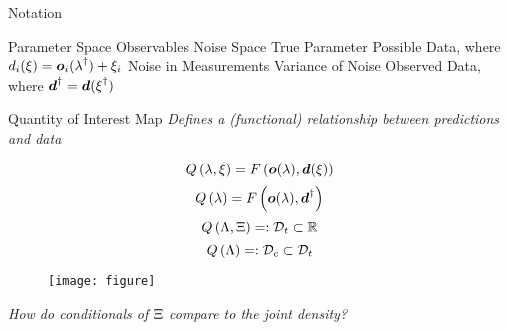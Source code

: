 \begin{block}{Notation}
\large
    \begin{itemize}
         Parameter Space
         Observables
         Noise Space
        \itembox{$\param^\dagger\in\pspace$} True Parameter
         Possible Data, where $d_i(\operatorname*{\xi}) = \boldsymbol{o}_i(\operatorname*{\lambda}^\dagger) + \xi_i$
        \itembox{$\noise^\dagger\in\nspace$} Noise in Measurements
        \itembox{$ \sigma $} Variance of Noise
         Observed Data, where $\boldsymbol{d}^\dagger = \boldsymbol{d}(\operatorname*{\xi}^\dagger)$
    \end{itemize}

\end{block}

\begin{block}{Quantity of Interest Map}
\centering
\large
    \emph{Defines a (functional) relationship between predictions and data}

        $$Q \left (\operatorname*{\lambda}, \operatorname*{\xi} \right ) = F \left ( \boldsymbol{o}(\operatorname*{\lambda}), \boldsymbol{d}(\operatorname*{\xi}) \right ) $$
        $$Q \left (\operatorname*{\lambda} \right ) = F \left ( \boldsymbol{o}(\operatorname*{\lambda}), \boldsymbol{d}^\dagger \right )$$
        $$Q \left ( \Lambda, \operatorname*{\Xi} \right ) =: \mathcal{D}_t \subset \mathbb{R}$$
        $$Q \left ( \Lambda \right ) =: \mathcal{D}_c \subset \mathcal{D}_t$$

    \begin{figure}
        \texttt{[image: figure]}
    \end{figure}

\large
    \emph{How do conditionals of $\operatorname*{\Xi}$ compare to the joint density?}

\end{block}
